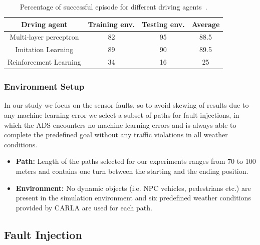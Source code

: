 \begin{table}
	\begin{tabular}{| c | c | c | c |}
		\hline
		Drving agent & Training env. & Testing env. & Average  \\
		\hline
		Multi-layer perceptron & 82 & 95 & 88.5  \\ 
 		Imitation Learning & 89 & 90 & 89.5 \\  
 		Reinforcement Learning  & 34 & 16 & 25 \\
 		\hline
 	\end{tabular}
 \caption{Percentage of successful episode for different driving agents~\cite{Dosovitskiy17}.}
 \label{table:1}
\end{table}

 \medskip

 
 \subsubsection{Environment Setup}
 \setcounter{subsubsection}{0}
 In our study we focus on the sensor faults, so to avoid skewing of results due to any machine learning error we select a subset of paths for fault injections, in which the ADS encounters no machine learning errors and is always able to complete the predefined goal without any traffic violations in all weather conditions.  
 \medskip
 \begin{itemize}
 	\item \textbf{Path:} Length of the paths selected for our experiments ranges from 70 to 100 meters and contains one turn between the starting and the ending position. 
 	
 	\smallskip
 	
 	\item \textbf{Environment:} No dynamic objects (i.e. NPC vehicles, pedestrians etc.) are present in the simulation environment and six predefined weather conditions provided by CARLA are used for each path. 
 \end{itemize}
 
 \subsection{Fault Injection} \label{fi_m}
 
